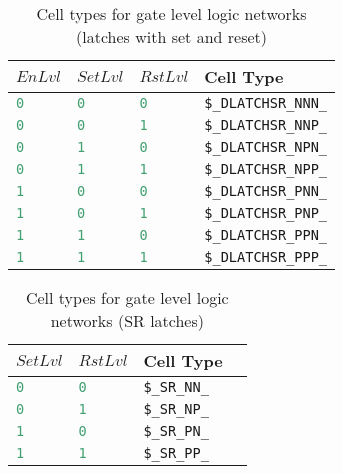 \begin{table}[t]
\hfil
\begin{tabular}[t]{llll}
$EnLvl$ & $SetLvl$ & $RstLvl$ & Cell Type \\
\hline
\lstinline[language=Verilog];0; & \lstinline[language=Verilog];0; & \lstinline[language=Verilog];0; & {\tt \$\_DLATCHSR\_NNN\_} \\
\lstinline[language=Verilog];0; & \lstinline[language=Verilog];0; & \lstinline[language=Verilog];1; & {\tt \$\_DLATCHSR\_NNP\_} \\
\lstinline[language=Verilog];0; & \lstinline[language=Verilog];1; & \lstinline[language=Verilog];0; & {\tt \$\_DLATCHSR\_NPN\_} \\
\lstinline[language=Verilog];0; & \lstinline[language=Verilog];1; & \lstinline[language=Verilog];1; & {\tt \$\_DLATCHSR\_NPP\_} \\
\lstinline[language=Verilog];1; & \lstinline[language=Verilog];0; & \lstinline[language=Verilog];0; & {\tt \$\_DLATCHSR\_PNN\_} \\
\lstinline[language=Verilog];1; & \lstinline[language=Verilog];0; & \lstinline[language=Verilog];1; & {\tt \$\_DLATCHSR\_PNP\_} \\
\lstinline[language=Verilog];1; & \lstinline[language=Verilog];1; & \lstinline[language=Verilog];0; & {\tt \$\_DLATCHSR\_PPN\_} \\
\lstinline[language=Verilog];1; & \lstinline[language=Verilog];1; & \lstinline[language=Verilog];1; & {\tt \$\_DLATCHSR\_PPP\_} \\
\end{tabular}
\caption{Cell types for gate level logic networks (latches with set and reset)}
\label{tab:CellLib_gates_dlatchsr}
\end{table}

\begin{table}[t]
\hfil
\begin{tabular}[t]{llll}
$SetLvl$ & $RstLvl$ & Cell Type \\
\hline
\lstinline[language=Verilog];0; & \lstinline[language=Verilog];0; & {\tt \$\_SR\_NN\_} \\
\lstinline[language=Verilog];0; & \lstinline[language=Verilog];1; & {\tt \$\_SR\_NP\_} \\
\lstinline[language=Verilog];1; & \lstinline[language=Verilog];0; & {\tt \$\_SR\_PN\_} \\
\lstinline[language=Verilog];1; & \lstinline[language=Verilog];1; & {\tt \$\_SR\_PP\_} \\
\end{tabular}
\caption{Cell types for gate level logic networks (SR latches)}
\label{tab:CellLib_gates_sr}
\end{table}


